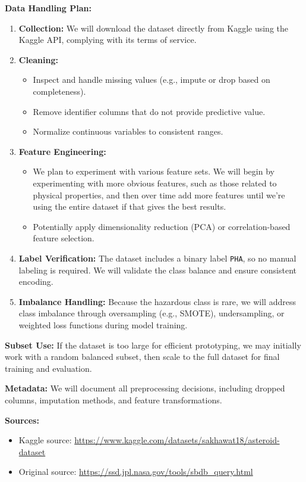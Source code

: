 \documentclass[12pt]{article}
\begin{document}
\textbf{Data Handling Plan:}
\begin{enumerate}
    \item \textbf{Collection:} We will download the dataset directly from Kaggle using the Kaggle API, complying with its terms of service.
    \item \textbf{Cleaning:}
    \begin{itemize}
        \item Inspect and handle missing values (e.g., impute or drop based on completeness).
        \item Remove identifier columns that do not provide predictive value.
        \item Normalize continuous variables to consistent ranges.
    \end{itemize}
    \item \textbf{Feature Engineering:}
    \begin{itemize}
        \item We plan to experiment with various feature sets. We will begin by experimenting with more obvious features, such as those related to physical properties, and then over time add more features until we're using the entire dataset if that gives the best results.
        \item Potentially apply dimensionality reduction (PCA) or correlation-based feature selection.
    \end{itemize}
    \item \textbf{Label Verification:}
    The dataset includes a binary label \texttt{PHA}, so no manual labeling is required. We will validate the class balance and ensure consistent encoding.
    \item \textbf{Imbalance Handling:}
    Because the hazardous class is rare, we will address class imbalance through oversampling (e.g., SMOTE), undersampling, or weighted loss functions during model training.
\end{enumerate}

\textbf{Subset Use:}
If the dataset is too large for efficient prototyping, we may initially work with a random balanced subset, then scale to the full dataset for final training and evaluation. \newline

\textbf{Metadata:}
We will document all preprocessing decisions, including dropped columns, imputation methods, and feature transformations. \newline

\textbf{Sources:}
\begin{itemize}
    \item Kaggle source: \url{https://www.kaggle.com/datasets/sakhawat18/asteroid-dataset}
    \item Original source: \url{https://ssd.jpl.nasa.gov/tools/sbdb_query.html}
\end{itemize}
\end{document}
